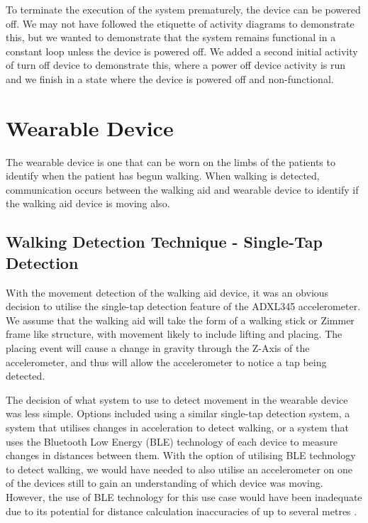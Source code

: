                 To terminate the execution of the system prematurely, the device can be powered off. We may not have followed the etiquette of activity diagrams to demonstrate this, but we wanted to demonstrate that the system remains functional in a constant loop unless the device is powered off. We added a second initial activity of turn off device to demonstrate this, where a power off device activity is run and we finish in a state where the device is powered off and non-functional.
            
    \section{Wearable Device}
    \label{sec:wearabledevice}

        The wearable device is one that can be worn on the limbs of the patients to identify when the patient has begun walking. When walking is detected, communication occurs between the walking aid and wearable device to identify if the walking aid device is moving also. 

        \subsection{Walking Detection Technique - Single-Tap Detection}
        \label{subsec:walking_detection_technique}

           With the movement detection of the walking aid device, it was an obvious decision to utilise the single-tap detection feature of the ADXL345 accelerometer. We assume that the walking aid will take the form of a walking stick or Zimmer frame like structure, with movement likely to include lifting and placing. The placing event will cause a change in gravity through the Z-Axis of the accelerometer, and thus will allow the accelerometer to notice a tap being detected.

           The decision of what system to use to detect movement in the wearable device was less simple. Options included using a similar single-tap detection system, a system that utilises changes in acceleration to detect walking, or a system that uses the Bluetooth Low Energy (BLE) technology of each device to measure changes in distances between them. With the option of utilising BLE technology to detect walking, we would have needed to also utilise an accelerometer on one of the devices still to gain an understanding of which device was moving. However, the use of BLE technology for this use case would have been inadequate due to its potential for distance calculation inaccuracies of up to several metres \cite{Fachri_2019}. 

